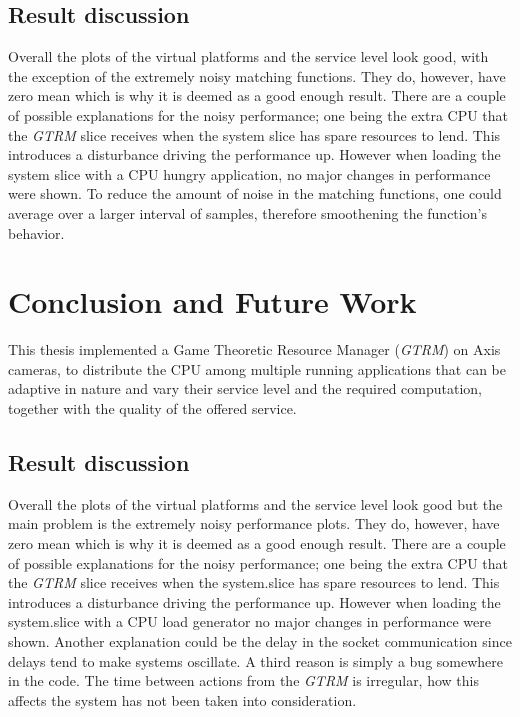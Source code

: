 \documentclass[nobiblatex]{LTHthesis}
\begin{document}
\section{Result discussion}

Overall the plots of the virtual platforms and the service level look good,
with the exception of the extremely noisy matching functions. They do, 
however, have zero mean which is why it is deemed as a good enough result.
There are a couple of possible explanations for the noisy performance; one
being the extra CPU that the \emph{GTRM} slice receives when the system slice has
spare resources to lend. This introduces a disturbance driving the 
performance up. However when loading the system slice with a CPU hungry
application, no major changes in performance were shown.
To reduce the amount of noise in the matching functions, one could average
over a larger interval of samples, therefore smoothening the function's
behavior.

\chapter{Conclusion and Future Work}
\label{chp:conclusion}

This thesis implemented a Game Theoretic Resource Manager (\emph{GTRM}) on Axis
cameras, to distribute the CPU among multiple running applications that can
be adaptive in nature and vary their service level and the required
computation, together with the quality of the offered service.


\section{Result discussion}

Overall the plots of the virtual platforms and the service level look good but the main problem is
the extremely noisy performance plots. They do, however, have zero mean which is why it is deemed as a good enough result.
There are a couple of possible explanations for the noisy performance; one being the extra CPU that the \emph{GTRM} slice receives when the system.slice has
spare resources to lend. This introduces a disturbance driving the performance up. However when loading the system.slice with a CPU load generator no major changes in performance were shown.
Another explanation could be the delay in the socket communication since delays tend to make systems oscillate. 
A third reason is simply a bug somewhere in the code.
The time between actions from the \emph{GTRM} is irregular, how this affects the system has not been taken into consideration.
\end{document}
